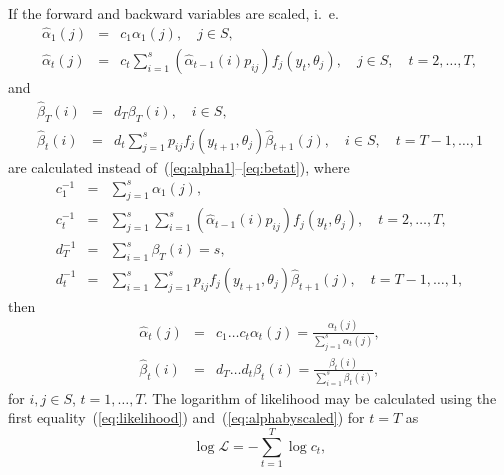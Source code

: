 If the forward and backward variables are scaled, i.~e.
\begin{eqnarray}
  \label{eq:alpha1scaled}
  \hat{\alpha}_1(j) & = & c_1 \alpha_1(j), \hspace{1em} j \in S, \\
  \label{eq:alphatscaled}
  \hat{\alpha}_t(j) & = & c_t \sum_{i = 1}^s (\hat{\alpha}_{t -
    1}(i)p_{ij}) f_j(y_t, \theta_j),
  \hspace{1em} j \in S, \hspace{1em} t = 2, \ldots, T,
\end{eqnarray}
and
\begin{eqnarray}
  \label{eq:betaTscaled}
  \hat{\beta}_T(i) & = & d_T \beta_T(i), \hspace{1em} i \in S, \\
  \label{eq:betatscaled}
  \hat{\beta}_t(i) & = & d_t \sum_{j = 1}^s p_{ij}f_j(y_{t + 1},
  \theta_j)\hat{\beta}_{t + 1}(j),
  \hspace{1em} i \in S, \hspace{1em} t = T - 1, \ldots, 1
\end{eqnarray}
are calculated instead of~(\ref{eq:alpha1}--\ref{eq:betat}), where
\begin{eqnarray}
  \label{eq:c1}
  c_1^{-1} & = & \sum_{j = 1}^s \alpha_1(j), \\
  \label{eq:ct}
  c_t^{-1} & = & \sum_{j = 1}^s \sum_{i = 1}^s (\hat{\alpha}_{t -
    1}(i)p_{ij}) f_j(y_t, \theta_j), \hspace{1em} t = 2, \ldots, T, \\
  \label{eq:dT}
  d_T^{-1} & = & \sum_{i = 1}^s \beta_T(i) = s, \\
  \label{eq:dt}
  d_t^{-1} & = & \sum_{i = 1}^s \sum_{j = 1}^s p_{ij}f_j(y_{t + 1},
  \theta_j)\hat{\beta}_{t + 1}(j),
  \hspace{1em} t = T - 1, \ldots, 1,
\end{eqnarray}
then
\begin{eqnarray}
  \label{eq:alphabyscaled}
  \hat{\alpha}_t(j) & = & c_1 \ldots c_t \alpha_t(j) =
  \frac{\alpha_t(j)}{\sum_{j = 1}^s \alpha_t(j)}, \\
  \label{eq:betabyscaled}
  \hat{\beta}_t(i) & = & d_T \ldots d_t \beta_t(i) =
  \frac{\beta_t(i)}{\sum_{i = 1}^s \beta_t(i)},
\end{eqnarray}
for $i, j \in S$, $t = 1, \ldots, T$. The logarithm of likelihood may be
calculated using the first equality~(\ref{eq:likelihood})
and~(\ref{eq:alphabyscaled}) for $t = T$ as
\begin{equation}
  \label{eq:loglikelihood}
  \log \mathcal{L} = - \sum_{t = 1}^T \log c_t,
\end{equation}
